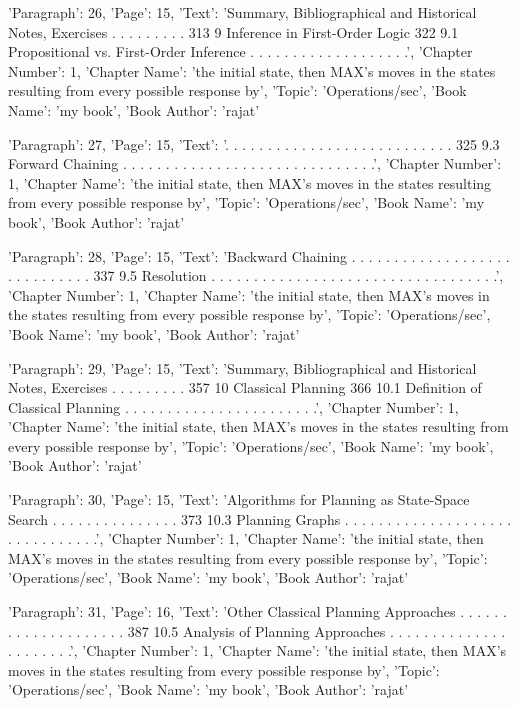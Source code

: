 {'Paragraph': 26, 'Page': 15, 'Text': 'Summary, Bibliographical and Historical Notes, Exercises . . . . . . . . . 313 9 Inference in First-Order Logic 322 9.1 Propositional vs. First-Order Inference . . . . . . . . . . . . . . . . . . .', 'Chapter Number': 1, 'Chapter Name': 'the initial state, then MAX’s moves in the states resulting from every possible response by', 'Topic': 'Operations/sec', 'Book Name': 'my book', 'Book Author': 'rajat'}

{'Paragraph': 27, 'Page': 15, 'Text': '. . . . . . . . . . . . . . . . . . . . . . . . . . . 325 9.3 Forward Chaining . . . . . . . . . . . . . . . . . . . . . . . . . . . . . .', 'Chapter Number': 1, 'Chapter Name': 'the initial state, then MAX’s moves in the states resulting from every possible response by', 'Topic': 'Operations/sec', 'Book Name': 'my book', 'Book Author': 'rajat'}

{'Paragraph': 28, 'Page': 15, 'Text': 'Backward Chaining . . . . . . . . . . . . . . . . . . . . . . . . . . . . . 337 9.5 Resolution . . . . . . . . . . . . . . . . . . . . . . . . . . . . . . . . . .', 'Chapter Number': 1, 'Chapter Name': 'the initial state, then MAX’s moves in the states resulting from every possible response by', 'Topic': 'Operations/sec', 'Book Name': 'my book', 'Book Author': 'rajat'}

{'Paragraph': 29, 'Page': 15, 'Text': 'Summary, Bibliographical and Historical Notes, Exercises . . . . . . . . . 357 10 Classical Planning 366 10.1 Deﬁnition of Classical Planning . . . . . . . . . . . . . . . . . . . . . . .', 'Chapter Number': 1, 'Chapter Name': 'the initial state, then MAX’s moves in the states resulting from every possible response by', 'Topic': 'Operations/sec', 'Book Name': 'my book', 'Book Author': 'rajat'}

{'Paragraph': 30, 'Page': 15, 'Text': 'Algorithms for Planning as State-Space Search . . . . . . . . . . . . . . . 373 10.3 Planning Graphs . . . . . . . . . . . . . . . . . . . . . . . . . . . . . . .', 'Chapter Number': 1, 'Chapter Name': 'the initial state, then MAX’s moves in the states resulting from every possible response by', 'Topic': 'Operations/sec', 'Book Name': 'my book', 'Book Author': 'rajat'}

{'Paragraph': 31, 'Page': 16, 'Text': 'Other Classical Planning Approaches . . . . . . . . . . . . . . . . . . . . 387 10.5 Analysis of Planning Approaches . . . . . . . . . . . . . . . . . . . . . .', 'Chapter Number': 1, 'Chapter Name': 'the initial state, then MAX’s moves in the states resulting from every possible response by', 'Topic': 'Operations/sec', 'Book Name': 'my book', 'Book Author': 'rajat'}

